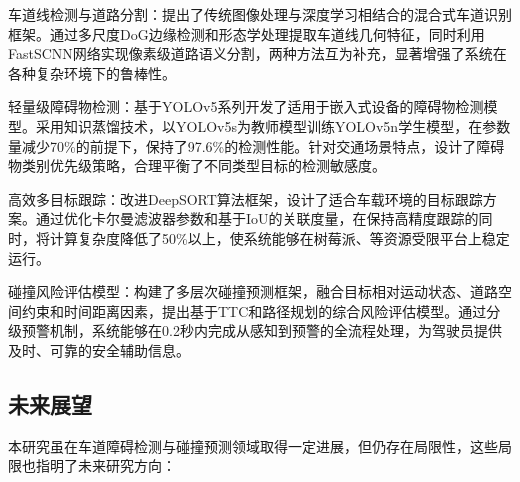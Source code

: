 \documentclass[a4paper, UTF8, fontsize=12pt]{ctexart} %
\numberwithin{equation}{section} %
\begin{document}
\begin{parlist}
    \item 车道线检测与道路分割：提出了传统图像处理与深度学习相结合的混合式车道识别框架。通过多尺度DoG边缘检测和形态学处理提取车道线几何特征，同时利用FastSCNN网络实现像素级道路语义分割，两种方法互为补充，显著增强了系统在各种复杂环境下的鲁棒性。

    \item 轻量级障碍物检测：基于YOLOv5系列开发了适用于嵌入式设备的障碍物检测模型。采用知识蒸馏技术，以YOLOv5s为教师模型训练YOLOv5n学生模型，在参数量减少70\%的前提下，保持了97.6\%的检测性能。针对交通场景特点，设计了障碍物类别优先级策略，合理平衡了不同类型目标的检测敏感度。

    \item 高效多目标跟踪：改进DeepSORT算法框架，设计了适合车载环境的目标跟踪方案。通过优化卡尔曼滤波器参数和基于IoU的关联度量，在保持高精度跟踪的同时，将计算复杂度降低了50\%以上，使系统能够在树莓派、等资源受限平台上稳定运行。

    \item 碰撞风险评估模型：构建了多层次碰撞预测框架，融合目标相对运动状态、道路空间约束和时间距离因素，提出基于TTC和路径规划的综合风险评估模型。通过分级预警机制，系统能够在0.2秒内完成从感知到预警的全流程处理，为驾驶员提供及时、可靠的安全辅助信息。
\end{parlist}

\subsection{未来展望}

本研究虽在车道障碍检测与碰撞预测领域取得一定进展，但仍存在局限性，这些局限也指明了未来研究方向：
\end{document}
